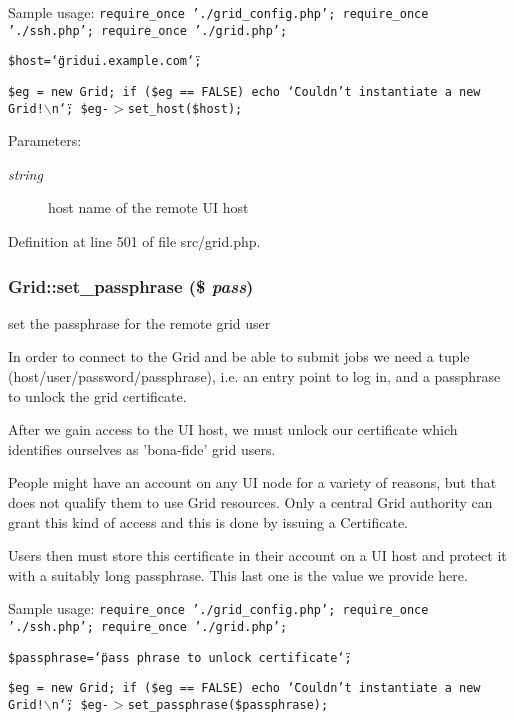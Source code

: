 Sample usage: {\tt  require\_\-once './grid\_\-config.php'; require\_\-once './ssh.php'; require\_\-once './grid.php';}

{\tt  \$host=\char`\"{}gridui.example.com\char`\"{};}

{\tt  \$eg = new Grid; if (\$eg == FALSE) echo \char`\"{}Couldn't instantiate a new Grid!$\backslash$n\char`\"{}; \$eg-$>$set\_\-host(\$host); }

\begin{Desc}
\item[Parameters:]
\begin{description}
\item[{\em string}]host name of the remote UI host \end{description}
\end{Desc}


Definition at line 501 of file src/grid.php.
\subsubsection{\setlength{\rightskip}{0pt plus 5cm}Grid::set\_\-passphrase (\$ {\em pass})}\label{classGrid_a31}


set the passphrase for the remote grid user 

In order to connect to the Grid and be able to submit jobs we need a tuple (host/user/password/passphrase), i.e. an entry point to log in, and a passphrase to unlock the grid certificate.

After we gain access to the UI host, we must unlock our certificate which identifies ourselves as 'bona-fide' grid users.

People might have an account on any UI node for a variety of reasons, but that does not qualify them to use Grid resources. Only a central Grid authority can grant this kind of access and this is done by issuing a Certificate.

Users then must store this certificate in their account on a UI host and protect it with a suitably long passphrase. This last one is the value we provide here.

Sample usage: {\tt  require\_\-once './grid\_\-config.php'; require\_\-once './ssh.php'; require\_\-once './grid.php';}

{\tt  \$passphrase=\char`\"{}pass phrase to unlock certificate\char`\"{};}

{\tt  \$eg = new Grid; if (\$eg == FALSE) echo \char`\"{}Couldn't instantiate a new Grid!$\backslash$n\char`\"{}; \$eg-$>$set\_\-passphrase(\$passphrase); }

